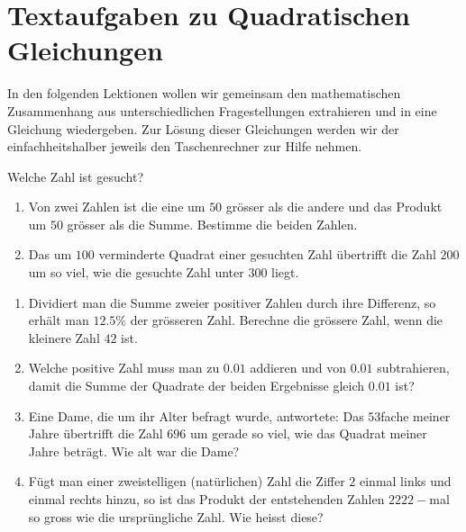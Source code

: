 \documentclass[11pt,oneside]{article}
\newcommand{\Skriptname}{Textaufgaben zu Quadratischen Gleichungen}
\begin{document}
\section*{\Skriptname}
In den folgenden Lektionen wollen wir gemeinsam den mathematischen Zusammenhang aus unterschiedlichen Fragestellungen extrahieren und in eine Gleichung wiedergeben. Zur Lösung dieser Gleichungen werden wir der einfachheitshalber jeweils den Taschenrechner zur Hilfe nehmen.
\begin{beispiel}
	Welche Zahl ist gesucht?
	\begin{enumerate}[label=\alph*)]
		\item Von zwei Zahlen ist die eine um $50$ grösser als die andere und das Produkt um $50$ grösser	als die Summe. Bestimme die beiden Zahlen.
	\end{enumerate}
	\begin{enumerate}[label=\alph*)]
		\setcounter{enumi}{1}
		\item Das um $100$ verminderte Quadrat einer gesuchten Zahl übertrifft die Zahl $200$ um so viel, wie die gesuchte Zahl unter $300$ liegt.
	\end{enumerate}
\end{beispiel}
\begin{aufgabe}
	\begin{enumerate}
		\item Dividiert man die Summe zweier positiver Zahlen durch ihre Differenz, so erhält man $12.5\%$ der grösseren Zahl. Berechne die grössere Zahl, wenn die kleinere Zahl $42$ ist.
		\item Welche positive Zahl muss man zu $0.01$ addieren und von $0.01$ subtrahieren, damit die	Summe der Quadrate der beiden Ergebnisse gleich $0.01$ ist?
		\item Eine Dame, die um ihr Alter befragt wurde, antwortete: \flqq Das $53$fache meiner Jahre übertrifft die Zahl $696$ um gerade so viel, wie das Quadrat meiner Jahre beträgt.\frqq\: Wie alt war die Dame?
		\item Fügt man einer zweistelligen (natürlichen) Zahl die Ziffer $2$ einmal links und einmal rechts hinzu, so ist das Produkt der entstehenden Zahlen $2222-$mal so gross wie die ursprüngliche Zahl. Wie heisst diese?
	\end{enumerate}
\end{aufgabe}

\newpage
\end{document}
